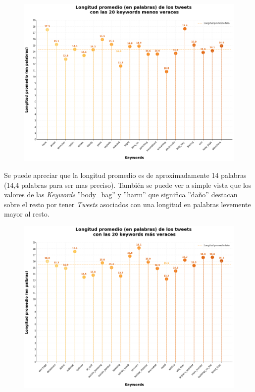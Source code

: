 \documentclass[titlepage,a4paper]{article}
\begin{document}
    \begin{figure}[H]
    \centering
    \includegraphics[width=1\textwidth]{graficos/Analisis de Keyword/long_prom_words_keywords_no_veraces.png}
    \caption{} 
    \end{figure}
    
    Se puede apreciar que la longitud promedio es de aproximadamente 14 palabras (14,4 palabras para ser mas preciso). También se puede ver a simple vista que los valores de las \textit{Keywords} ''body\_bag'' y ''harm'' que significa ''daño'' destacan sobre el resto por tener \textit{Tweets} asociados con una longitud en palabras levemente mayor al resto.
     
    
    \begin{figure}[H]
    \centering
    \includegraphics[width=1\textwidth]{graficos/Analisis de Locacion/output_33_1.png}
    \caption{} 
    \end{figure}
\end{document}
